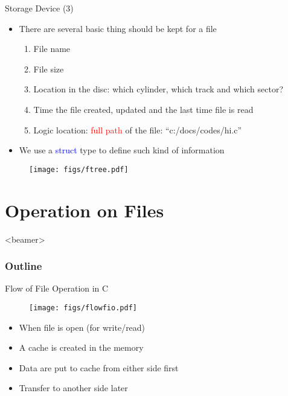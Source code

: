 \begin{frame}{Storage Device (3)}
\begin{itemize}
	\item {There are several basic thing should be kept for a file}
	\begin{enumerate}
		\item {File name}
		\item {File size}
		\item {Location in the disc: which cylinder, which track and which sector?}
		\item {Time the file created, updated and the last time file is read}
		\item {Logic location: \textcolor{red}{full path} of the file: ``c:/docs/codes/hi.c''}
	\end{enumerate}
	\item {We use a \textcolor{blue}{struct} type to define such kind of information}
\end{itemize}
\begin{figure}
	\texttt{[image: figs/ftree.pdf]}
\end{figure}
\end{frame}

\section{Operation on Files}
\label{sec:file}
\begin{frame}<beamer>
    \frametitle{Outline}
    \tableofcontents[currentsection]
\end{frame}

\begin{frame}{Flow of File Operation in C}
\begin{figure}
	\texttt{[image: figs/flowfio.pdf]}
\end{figure}
\begin{itemize}
	\item {When file is open (for write/read)}
	\item {A cache is created in the memory}
	\item {Data are put to cache from either side first}
	\item {Transfer to another side later}
\end{itemize}
\end{frame}

